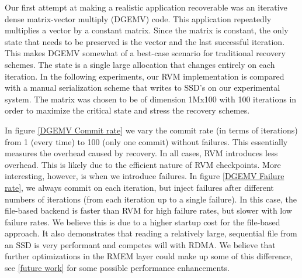 Our first attempt at making a realistic application recoverable was an iterative
dense matrix-vector multiply (DGEMV) code. This application repeatedly
multiplies a vector by a constant matrix. Since the matrix is constant, the
only state that needs to be preserved is the vector and the last successful
iteration. This makes DGEMV somewhat of a best-case scenario for traditional
recovery schemes. The state is a single large allocation that changes entirely
on each iteration. In the following experiments, our RVM implementation is
compared with a manual serialization scheme that writes to SSD's on our
experimental system. The matrix was chosen to be of dimension 1Mx100 with 100
iterations in order to maximize the critical state and stress the recovery
schemes.


In figure \ref{DGEMV Commit rate} we vary the commit rate (in terms of
iterations) from 1 (every time) to 100 (only one commit) without failures. This
essentially measures the overhead caused by recovery. In all cases, RVM
introduces less overhead. This is likely due to the efficient nature of RVM
checkpoints. More interesting, however, is when we introduce failures. In figure
\ref{DGEMV Failure rate}, we always commit on each iteration, but inject
failures after different numbers of iterations (from each iteration up to a
single failure). In this case, the file-based backend is faster than RVM for
high failure rates, but slower with low failure rates. We believe this is due to
a higher startup cost for the file-based approach. It also demonstrates that
reading a relatively large, sequential file from an SSD is very performant and
competes will with RDMA. We believe that further optimizations in the RMEM layer
could make up some of this difference, see \ref{future work} for some possible
performance enhancements.

